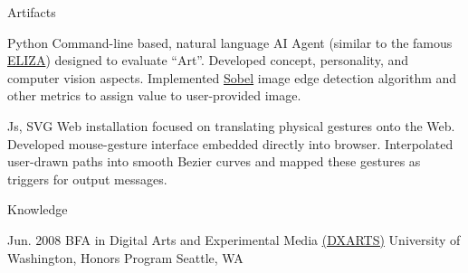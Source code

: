 \documentclass{resunate}
\begin{document}
\begin{resume}
\begin{body}
    \begin{section}{Artifacts}

      \vspace{5pt} %

            {Python \wrench}
            {Command-line based, natural language AI Agent (similar to the famous \href{http://en.wikipedia.org/wiki/ELIZA}{ELIZA}) designed to evaluate “Art”. Developed concept, personality, and computer vision aspects. Implemented \href{http://en.wikipedia.org/wiki/Sobel_operator}{Sobel} image edge detection algorithm and other metrics to assign value to user-provided image.}

            {Js, SVG \wrench}
            {Web installation focused on translating physical gestures onto the Web. Developed mouse-gesture interface embedded directly into browser. Interpolated user-drawn paths into smooth Bezier curves and mapped these gestures as triggers for output messages.}

    \end{section}

    \begin{section}{Knowledge}

                {Jun. 2008}
                {BFA in Digital Arts and Experimental Media \href{http://www.dxarts.washington.edu/}{(DXARTS)}}
                {University of Washington, Honors Program}
                {Seattle, WA}

    \end{section}

  \end{body}
\end{resume}
\end{document}
